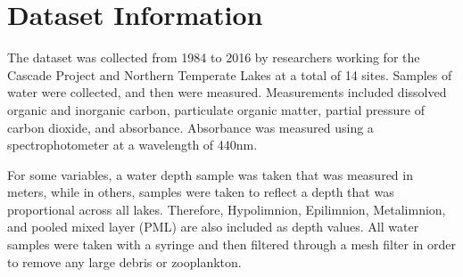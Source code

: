 \documentclass[12pt,]{article}
\begin{document}
\newpage

\section{Dataset Information}\label{dataset-information}

The dataset was collected from 1984 to 2016 by researchers working for
the Cascade Project and Northern Temperate Lakes at a total of 14 sites.
Samples of water were collected, and then were measured. Measurements
included dissolved organic and inorganic carbon, particulate organic
matter, partial pressure of carbon dioxide, and absorbance. Absorbance
was measured using a spectrophotometer at a wavelength of 440nm.

For some variables, a water depth sample was taken that was measured in
meters, while in others, samples were taken to reflect a depth that was
proportional across all lakes. Therefore, Hypolimnion, Epilimnion,
Metalimnion, and pooled mixed layer (PML) are also included as depth
values. All water samples were taken with a syringe and then filtered
through a mesh filter in order to remove any large debris or
zooplankton.
\end{document}
